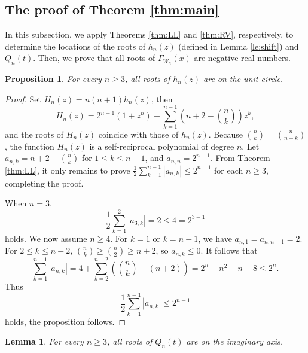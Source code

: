 \documentclass[12pt]{article}
\newtheorem{proposition}[theorem]{Proposition}
\newtheorem{lemma}[theorem]{Lemma}
\theoremstyle{definition}
\begin{document}
\subsection{The proof of  Theorem \ref{thm:main}}
In this subsection, we apply Theorems \ref{thm:LL} and \ref{thm:RV}, respectively, to determine the locations of the roots of $h_n(z)$ (defined in Lemma \ref{le:shift}) and
$Q_n(t)$. Then, we prove that all roots of
$\Gamma_{W_n}(x)$ are negative real numbers.

\begin{proposition}\label{pr3:6}
For every $n\geq 3$, all roots of $h_{n}(z)$ are on the unit circle.
\end{proposition}

\begin{proof}
Set $H_n(z)=n(n+1)h_{n}(z)$, then
$$H_{n}(z)=2^{n-1}(1+z^n)+\sum_{k=1}^{n-1}\left(n+2-\binom{n}{k}\right)z^k,$$ and the roots of $H_n(z)$ coincide with those of $h_{n}(z)$.
Because $\binom{n}{k}=\binom{n}{n-k}$, the function $H_n(z)$ is a self-reciprocal polynomial of degree $n$. Let $a_{n,k}=n+2-\binom{n}{k}$ for $1\leq k\leq n-1$, and $a_{n,n}=2^{n-1}$. From Theorem \ref{thm:LL}, it only remains to prove $ \frac12\sum_{k=1}^{n-1}|a_{n,k}|\leq 2^{n-1}$ for each $n\geq 3$, completing the proof.

When \(n=3\),
$$ \frac12\sum_{k=1}^{2}|a_{3,k}|=2\leq 4=2^{3-1}$$ holds. We now assume $n\geq 4$. For $k=1$ or $k=n-1$, we have $a_{n,1}=a_{n,n-1}=2$. For \(2\le k\le n-2\),
\(\binom{n}{k}\ge \binom{n}{2}\ge n+2\), so $a_{n,k}\leq 0$. It follows that
\[
\sum_{k=1}^{n-1}|a_{n,k}|
=4+\sum_{k=2}^{n-2}\left(\binom{n}{k}-(n+2)\right)
=2^n-n^2-n+8\le 2^n.
\]
Thus
\[
\frac12\sum_{k=1}^{n-1}|a_{n,k}|\le 2^{n-1}
\]
holds, the proposition follows.
\end{proof}


\begin{lemma}\label{le3:7}
For every $n\geq 3$, all roots of $Q_{n}(t)$ are on the imaginary axis.
\end{lemma}
\end{document}
